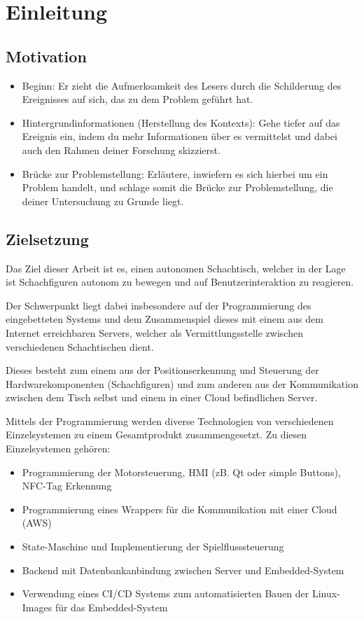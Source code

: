 \hypertarget{einleitung}{%
\section{Einleitung}\label{einleitung}}

\hypertarget{motivation}{%
\subsection{Motivation}\label{motivation}}

\begin{itemize}
\tightlist
\item
  Beginn: Er zieht die Aufmerksamkeit des Lesers durch die Schilderung
  des Ereignisses auf sich, das zu dem Problem geführt hat.
\item
  Hintergrundinformationen (Herstellung des Kontexts): Gehe tiefer auf
  das Ereignis ein, indem du mehr Informationen über es vermittelst und
  dabei auch den Rahmen deiner Forschung skizzierst.
\item
  Brücke zur Problemstellung: Erläutere, inwiefern es sich hierbei um
  ein Problem handelt, und schlage somit die Brücke zur Problemstellung,
  die deiner Untersuchung zu Grunde liegt.
\end{itemize}

\hypertarget{zielsetzung}{%
\subsection{Zielsetzung}\label{zielsetzung}}

Das Ziel dieser Arbeit ist es, einen autonomen Schachtisch, welcher in
der Lage ist Schachfiguren autonom zu bewegen und auf
Benutzerinteraktion zu reagieren.

Der Schwerpunkt liegt dabei insbesondere auf der Programmierung des
eingebetteten Systems und dem Zusammenspiel dieses mit einem aus dem
Internet erreichbaren Servers, welcher als Vermittlungsstelle zwischen
verschiedenen Schachtischen dient.

Dieses besteht zum einem aus der Positionserkennung und Steuerung der
Hardwarekomponenten (Schachfiguren) und zum anderen aus der
Kommunikation zwischen dem Tisch selbst und einem in einer Cloud
befindlichen Server.

Mittels der Programmierung werden diverse Technologien von verschiedenen
Einzelsystemen zu einem Gesamtprodukt zusammengesetzt. Zu diesen
Einzelsystemen gehören:

\begin{itemize}
\tightlist
\item
  Programmierung der Motorsteuerung, HMI (zB. Qt oder simple Buttons),
  NFC-Tag Erkennung
\item
  Programmierung eines Wrappers für die Kommunikation mit einer Cloud
  (AWS)
\item
  State-Maschine und Implementierung der Spielflusssteuerung
\item
  Backend mit Datenbankanbindung zwischen Server und Embedded-System
\item
  Verwendung eines CI/CD Systems zum automatisierten Bauen der
  Linux-Images für das Embedded-System
\end{itemize}

